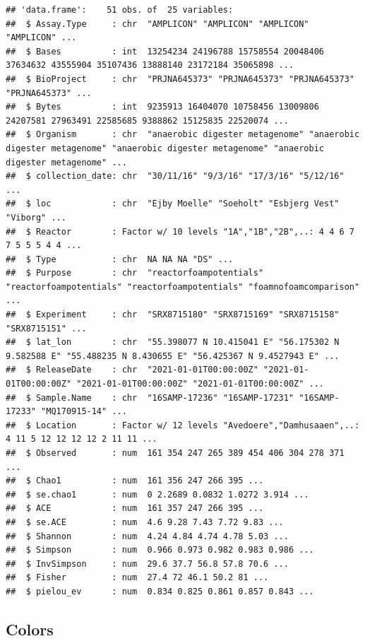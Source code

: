 \documentclass[
]{book}
\begin{document}
\begin{verbatim}
## 'data.frame':    51 obs. of  25 variables:
##  $ Assay.Type     : chr  "AMPLICON" "AMPLICON" "AMPLICON" "AMPLICON" ...
##  $ Bases          : int  13254234 24196788 15758554 20048406 37634632 43555904 35107436 13888140 23172184 35065898 ...
##  $ BioProject     : chr  "PRJNA645373" "PRJNA645373" "PRJNA645373" "PRJNA645373" ...
##  $ Bytes          : int  9235913 16404070 10758456 13009806 24207581 27963491 22585685 9388862 15125835 22520074 ...
##  $ Organism       : chr  "anaerobic digester metagenome" "anaerobic digester metagenome" "anaerobic digester metagenome" "anaerobic digester metagenome" ...
##  $ collection_date: chr  "30/11/16" "9/3/16" "17/3/16" "5/12/16" ...
##  $ loc            : chr  "Ejby Moelle" "Soeholt" "Esbjerg Vest" "Viborg" ...
##  $ Reactor        : Factor w/ 10 levels "1A","1B","2B",..: 4 4 6 7 7 5 5 5 4 4 ...
##  $ Type           : chr  NA NA NA "DS" ...
##  $ Purpose        : chr  "reactorfoampotentials" "reactorfoampotentials" "reactorfoampotentials" "foamnofoamcomparison" ...
##  $ Experiment     : chr  "SRX8715180" "SRX8715169" "SRX8715158" "SRX8715151" ...
##  $ lat_lon        : chr  "55.398077 N 10.415041 E" "56.175302 N 9.582588 E" "55.488235 N 8.430655 E" "56.425367 N 9.4527943 E" ...
##  $ ReleaseDate    : chr  "2021-01-01T00:00:00Z" "2021-01-01T00:00:00Z" "2021-01-01T00:00:00Z" "2021-01-01T00:00:00Z" ...
##  $ Sample.Name    : chr  "16SAMP-17236" "16SAMP-17231" "16SAMP-17233" "MQ170915-14" ...
##  $ Location       : Factor w/ 12 levels "Avedoere","Damhusaaen",..: 4 11 5 12 12 12 12 2 11 11 ...
##  $ Observed       : num  161 354 247 265 389 454 406 304 278 371 ...
##  $ Chao1          : num  161 356 247 266 395 ...
##  $ se.chao1       : num  0 2.2689 0.0832 1.0272 3.914 ...
##  $ ACE            : num  161 357 247 266 395 ...
##  $ se.ACE         : num  4.6 9.28 7.43 7.72 9.83 ...
##  $ Shannon        : num  4.24 4.84 4.74 4.78 5.03 ...
##  $ Simpson        : num  0.966 0.973 0.982 0.983 0.986 ...
##  $ InvSimpson     : num  29.6 37.7 56.8 57.8 70.6 ...
##  $ Fisher         : num  27.4 72 46.1 50.2 81 ...
##  $ pielou_ev      : num  0.834 0.825 0.861 0.857 0.843 ...
\end{verbatim}

\hypertarget{colors}{%
\subsection{Colors}\label{colors}}
\end{document}

